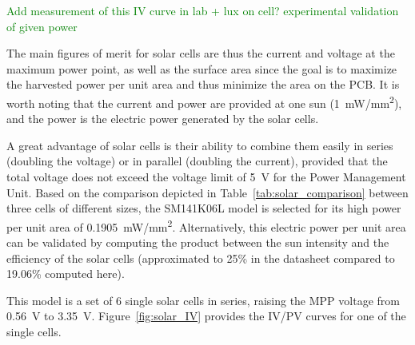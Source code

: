 \documentclass{EPL-master-thesis-covers-EN}
\begin{document}
\textcolor{green}{Add measurement of this IV curve in lab + lux on cell? experimental validation of given power} 

The main figures of merit for solar cells are thus the current and voltage at the maximum power point, as well as the surface area since the goal is to maximize the harvested power per unit area and thus minimize the area on the PCB. It is worth noting that the current and power are provided at one sun (\SI{1}{mW/mm^2}), and the power is the electric power generated by the solar cells.

A great advantage of solar cells is their ability to combine them easily in series (doubling the voltage) or in parallel (doubling the current), provided that the total voltage does not exceed the voltage limit of \SI{5}{V} for the Power Management Unit. Based on the comparison depicted in Table~\ref{tab:solar_comparison} between three cells of different sizes, the SM141K06L model is selected for its high power per unit area of \SI{0.1905}{mW/mm^2}. Alternatively, this electric power per unit area can be validated by computing the product between the sun intensity and the efficiency of the solar cells (approximated to 25\% in the datasheet compared to 19.06\% computed here).

\begin{table}[H]
\centering
{}
\caption{Comparison of several solar cells}
\label{tab:solar_comparison}
\end{table}

This model is a set of 6 single solar cells in series, raising the MPP voltage from \SI{0.56}{V} to \SI{3.35}{V}. Figure~\ref{fig:solar_IV} provides the IV/PV curves for one of the single cells.
\end{document}
